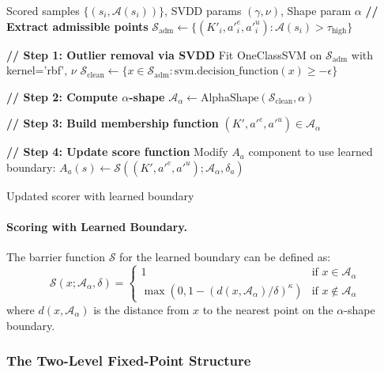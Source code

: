 \begin{algorithm}[H]
\caption{Hybrid Boundary Refinement}
\label{alg:hybrid_boundary}
\begin{algorithmic}[1]
\Require Scored samples $\{(s_i, \mathcal{A}(s_i))\}$, SVDD params $(\gamma, \nu)$, Shape param $\alpha$
\State \textbf{// Extract admissible points}
\State $\mathcal{S}_{\text{adm}} \gets \{(K'_i, a'^e_i, a'^u_i) : \mathcal{A}(s_i) > \tau_{\text{high}}\}$

\State
\State \textbf{// Step 1: Outlier removal via SVDD}
\State Fit OneClassSVM on $\mathcal{S}_{\text{adm}}$ with kernel='rbf', $\nu$
\State $\mathcal{S}_{\text{clean}} \gets \{x \in \mathcal{S}_{\text{adm}} : \text{svm.decision\_function}(x) \geq -\epsilon\}$

\State
\State \textbf{// Step 2: Compute $\alpha$-shape}
\State $\mathcal{A}_\alpha \gets \text{AlphaShape}(\mathcal{S}_{\text{clean}}, \alpha)$

\State
\State \textbf{// Step 3: Build membership function}
    \State \Return $(K', a'^e, a'^u) \in \mathcal{A}_\alpha$
\EndFunction

\State
\State \textbf{// Step 4: Update score function}
\State Modify $A_a$ component to use learned boundary:
\State $A_a(s) \gets \mathcal{S}((K', a'^e, a'^u); \mathcal{A}_\alpha, \delta_a)$

\State \Return Updated scorer with learned boundary
\end{algorithmic}
\end{algorithm}

\paragraph{Scoring with Learned Boundary.}
The barrier function $\mathcal{S}$ for the learned boundary can be defined as:
\begin{equation}
    \mathcal{S}(x; \mathcal{A}_\alpha, \delta) = \begin{cases}
        1 & \text{if } x \in \mathcal{A}_\alpha \\
        \max(0, 1 - (d(x, \mathcal{A}_\alpha) / \delta)^\kappa) & \text{if } x \notin \mathcal{A}_\alpha
    \end{cases}
\end{equation}
where $d(x, \mathcal{A}_\alpha)$ is the distance from $x$ to the nearest point on the $\alpha$-shape boundary.


\subsubsection{The Two-Level Fixed-Point Structure}

